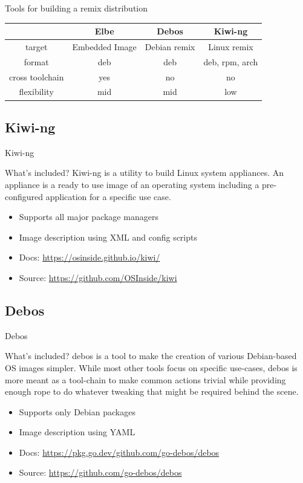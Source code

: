 \documentclass{beamer}
\begin{document}
\begin{frame}{Tools for building a remix distribution}
	\begin{tabular}{c|ccc}
		& \textbf{Elbe} & \textbf{Debos} & \textbf{Kiwi-ng} \\
		\hline
		target & Embedded Image & Debian remix & Linux remix \\ 
		format & deb & deb & deb, rpm, arch \\
		cross toolchain & yes & no & no \\
		flexibility & mid & mid & low \\
	\end{tabular}
\end{frame}

\subsection{Kiwi-ng}

\begin{frame}{Kiwi-ng}
	\begin{block}{What's included?} 
		Kiwi-ng is a utility to build Linux system appliances. 
		An appliance is a ready to use image of an operating system including a pre-configured application for a specific use case. 
	\end{block}

	\begin{itemize}
		\item Supports all major package managers
		\item Image description using XML and config scripts
		\item Docs: \url{https://osinside.github.io/kiwi/}
		\item Source: \url{https://github.com/OSInside/kiwi}
	\end{itemize}
\end{frame}

\subsection{Debos}

\begin{frame}{Debos}
	\begin{block}{What's included?} 
		debos is a tool to make the creation of various Debian-based OS images simpler. While most other tools focus on specific use-cases, debos is more meant as a tool-chain to make common actions trivial while providing enough rope to do whatever tweaking that might be required behind the scene.
	\end{block}
	
	\begin{itemize}
		\item Supports only Debian packages
		\item Image description using YAML
		\item Docs: \url{https://pkg.go.dev/github.com/go-debos/debos}
		\item Source: \url{https://github.com/go-debos/debos}
	\end{itemize}
\end{frame}
\end{document}
